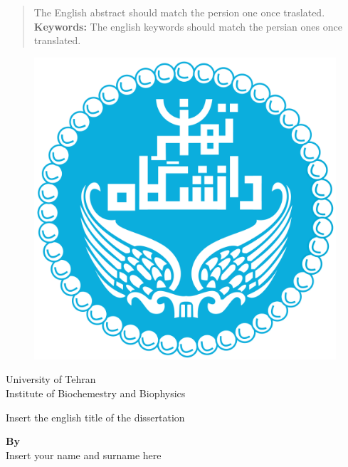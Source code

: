 \documentclass[12pt]{report}
\begin{document}
\begin{latin}
\begin{abstract}
The English abstract should match the persion one once traslated.\\[0.5cm]
\textbf{Keywords: } The english keywords should match the persian ones once translated. 
\end{abstract}
\newpage

\begin{figure}
\centering
\includegraphics[scale=0.1]{UT-Logo.png}
\end{figure}
\begin{center}
University of Tehran\\
Institute of Biochemestry and Biophysics
\end{center}

\vfill

\begin{center}
\LARGE{Insert the english title of the dissertation}
\end{center}

\vfill

{\large \begin{center}
\textbf{
By\\
} Insert your name and surname here 
\end{center}

}
\end{latin}
\end{document}
